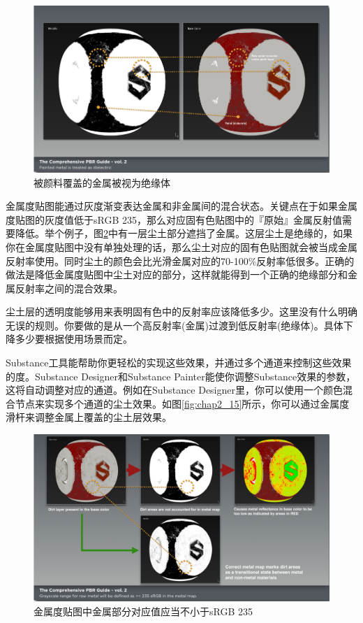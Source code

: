 \begin{figure}[ht]
    \centering
	\includegraphics[width=\textwidth]{images/chap2_13.png}
	\caption{被颜料覆盖的金属被视为绝缘体}
    \label{fig:chap2_13}
\end{figure}

金属度贴图能通过灰度渐变表达金属和非金属间的混合状态。关键点在于如果金属度贴图的灰度值低于sRGB 235，那么对应固有色贴图中的『原始』金属反射值需要降低。举个例子，图\ref{fig:chap2_14}中有一层尘土部分遮挡了金属。这层尘土是绝缘的，如果你在金属度贴图中没有单独处理的话，那么尘土对应的固有色贴图就会被当成金属反射率使用。同时尘土的颜色会比光滑金属对应的70-100\%反射率低很多。正确的做法是降低金属度贴图中尘土对应的部分，这样就能得到一个正确的绝缘部分和金属反射率之间的混合效果。

尘土层的透明度能够用来表明固有色中的反射率应该降低多少。这里没有什么明确无误的规则。你要做的是从一个高反射率(金属)过渡到低反射率(绝缘体)。具体下降多少要根据使用场景而定。

Substance工具能帮助你更轻松的实现这些效果，并通过多个通道来控制这些效果的度。Substance Designer和Substance Painter能使你调整Substance效果的参数，这将自动调整对应的通道。例如在Substance Designer里，你可以使用一个颜色混合节点来实现多个通道的尘土效果。如图\ref{fig:chap2_15}所示，你可以通过金属度滑杆来调整金属上覆盖的尘土层效果。

\begin{figure}[ht]
    \centering
	\includegraphics[width=\textwidth]{images/chap2_14.png}
	\caption{金属度贴图中金属部分对应值应当不小于sRGB 235}
    \label{fig:chap2_14}
\end{figure}

